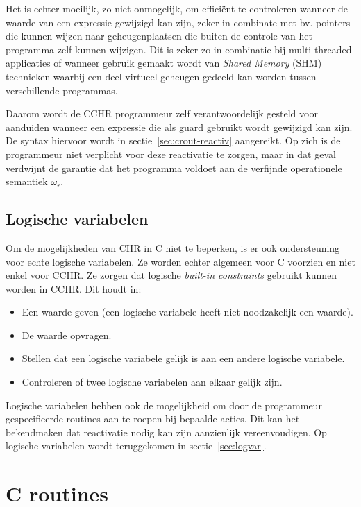 Het is echter moeilijk, zo niet onmogelijk, om effici\"ent te controleren wanneer de waarde van een expressie gewijzigd kan zijn, zeker in combinate met bv. pointers die kunnen wijzen naar geheugenplaatsen die buiten de controle van het programma zelf kunnen wijzigen. Dit is zeker zo in combinatie bij multi-threaded applicaties of wanneer gebruik gemaakt wordt van {\em Shared Memory} (SHM) technieken waarbij een deel virtueel geheugen gedeeld kan worden tussen verschillende programmas.

Daarom wordt de CCHR programmeur zelf verantwoordelijk gesteld voor aanduiden wanneer een expressie die als guard gebruikt wordt gewijzigd kan zijn. De syntax hiervoor wordt in sectie~\ref{sec:crout-reactiv} aangereikt. Op zich is de programmeur niet verplicht voor deze reactivatie te zorgen, maar in dat geval verdwijnt de garantie dat het programma voldoet aan de verfijnde operationele semantiek $\omega_r$.

\subsection{Logische variabelen}

Om de mogelijkheden van CHR in C niet te beperken, is er ook ondersteuning voor echte logische variabelen. Ze worden echter algemeen voor C voorzien en niet enkel voor CCHR. Ze zorgen dat logische {\em built-in constraints} gebruikt kunnen worden in CCHR. Dit houdt in: \begin{itemize}
  \item Een waarde geven (een logische variabele heeft niet noodzakelijk een waarde).
  \item De waarde opvragen.
  \item Stellen dat een logische variabele gelijk is aan een andere logische variabele.
  \item Controleren of twee logische variabelen aan elkaar gelijk zijn.
\end{itemize}

Logische variabelen hebben ook de mogelijkheid om door de programmeur gespecifieerde routines aan te roepen bij bepaalde acties. Dit kan het bekendmaken dat reactivatie nodig kan zijn aanzienlijk vereenvoudigen. Op logische variabelen wordt teruggekomen in sectie~\ref{sec:logvar}.

\section{C routines}

